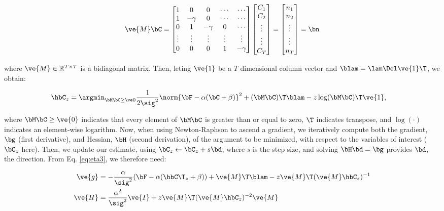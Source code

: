 \begin{align} \label{eq:M}
\ve{M} \bC = %
\begin{bmatrix}
1 & 0  & 0 & \cdots & \cdots \\
1 & -\gamma & 0 & \cdots & \cdots \\
0 & 1 & -\gamma & 0 & \cdots  \\
\vdots & \vdots & \vdots & \vdots & \vdots  \\
0 & 0 & 0 & 1 & -\gamma
\end{bmatrix}
\begin{bmatrix}
C_1 \\ C_2 \\ \vdots \\ \vdots \\ C_T  
\end{bmatrix}
= 
\begin{bmatrix}
n_1 \\ n_2 \\ \vdots \\ \vdots \\ n_T
\end{bmatrix}
= \bn
\end{align}

\noindent where $\ve{M} \in \mathbb{R}^{T \times T}$ is a bidiagonal matrix.  Then, leting $\ve{1}$ be a $T$ dimensional column vector and $\blam=\lam \Del \ve{1}\T$, we obtain: 

\begin{align} 
\hbC_{\zzz} 
&= \az  \frac{1}{2 \sig^2} \norm{\bF - \alpha (\bC +\beta)}^2 + (\bM \bC )\T \blam  - \zzz \log(\bM \bC)\T\ve{1},  \label{eq:eta3}
\end{align}

\noindent where $\bM \bC \geq \ve{0}$ indicates that every element of $\bM \bC$ is greater than or equal to zero, $\T$ indicates transpose, and $\log(\cdot)$ indicates an element-wise logarithm. Now, when using Newton-Raphson to ascend a gradient, we iteratively compute both the gradient, $\bg$ (first derivative), and Hessian, $\bH$ (second derivation), of the argument to be minimized, with respect to the variables of interest ($\bC_z$ here).  Then, we update our estimate, using $\bC_z \leftarrow \bC_z + s \bd$, where $s$ is the step size, and solving $\bH \bd = \bg$ provides $\bd$, the direction.  From Eq. \eqref{eq:eta3}, we therefore need:

\begin{subequations} \label{eq:NR}
\begin{align}
\ve{g} &= -\frac{\alpha}{\sig^2}(\bF -\alpha({\hbC\T}_{\zzz} + \beta)) + \ve{M}\T\blam - \zzz \ve{M}\T (\ve{M} \hbC_{\zzz})^{-1} \label{eq:g} \\
\ve{H} &= \frac{\alpha^2}{\sig^2} \ve{I} + \zzz \ve{M}\T (\ve{M} \hbC_{\zzz})^{-2} \ve{M} \label{eq:H}
\end{align}
\end{subequations}

